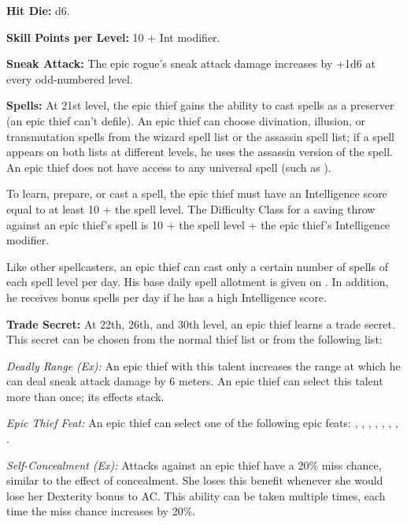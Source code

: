 
\textbf{Hit Die:} d6.

\textbf{Skill Points per Level:} 10 + Int modifier.

\textbf{Sneak Attack:} The epic rogue's sneak attack damage increases by +1d6 at every odd-numbered level.

\textbf{Spells:} At 21st level, the epic thief gains the ability to cast spells as a preserver (an epic thief can't defile). An epic thief can choose divination, illusion, or transmutation spells from the wizard spell list or the assassin spell list; if a spell appears on both lists at different levels, he uses the assassin version of the spell. An epic thief does not have access to any universal spell (such as ).


To learn, prepare, or cast a spell, the epic thief must have an Intelligence score equal to at least 10 + the spell level. The Difficulty Class for a saving throw against an epic thief's spell is 10 + the spell level + the epic thief's Intelligence modifier.

Like other spellcasters, an epic thief can cast only a certain number of spells of each spell level per day. His base daily spell allotment is given on . In addition, he receives bonus spells per day if he has a high Intelligence score.

\textbf{Trade Secret:} At 22th, 26th, and 30th level, an epic thief learns a trade secret. This secret can be chosen from the normal thief list or from the following list:

\textit{Deadly Range (Ex):} An epic thief with this talent increases the range at which he can deal sneak attack damage by 6 meters. An epic thief can select this talent more than once; its effects stack.

\textit{Epic Thief Feat:} An epic thief can select one of the following epic feats:
,
,
,
,
,
,
,
.

\textit{Self-Concealment (Ex):} Attacks against an epic thief have a 20\% miss chance, similar to the effect of concealment. She loses this benefit whenever she would lose her Dexterity bonus to AC. This ability can be taken multiple times, each time the miss chance increases by 20\%.


